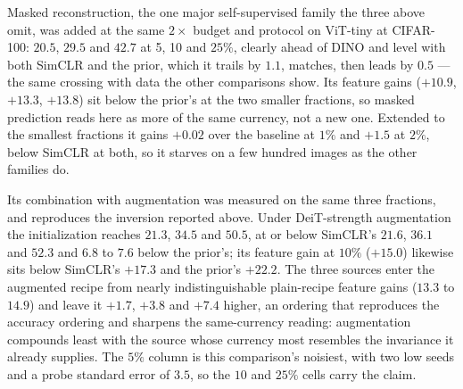  Masked reconstruction, the one major self-supervised family the
three above omit, was added at the same $2\times$ budget and protocol on
ViT-tiny at CIFAR-100: $20.5$, $29.5$ and $42.7$ at 5, 10 and $25\%$, clearly
ahead of DINO and level with both SimCLR and the prior, which it trails by
$1.1$, matches, then leads by $0.5$ --- the same crossing with data the other
comparisons show. Its feature gains ($+10.9$, $+13.3$, $+13.8$) sit below the
prior's at the two smaller fractions, so masked prediction reads here as more
of the same currency, not a new one. Extended to the smallest fractions it
gains $+0.02$ over the baseline at $1\%$ and $+1.5$ at $2\%$, below SimCLR at
both, so it starves on a few hundred images as the other families do.

 Its combination with augmentation was measured on the same three
fractions, and reproduces the inversion reported above. Under DeiT-strength
augmentation the initialization reaches $21.3$, $34.5$ and $50.5$, at or below
SimCLR's $21.6$, $36.1$ and $52.3$ and $6.8$ to $7.6$ below the prior's; its
feature gain at $10\%$ ($+15.0$) likewise sits below SimCLR's $+17.3$ and the
prior's $+22.2$. The three sources enter the augmented recipe from nearly
indistinguishable plain-recipe feature gains ($13.3$ to $14.9$) and leave it
$+1.7$, $+3.8$ and $+7.4$ higher, an ordering that reproduces the accuracy
ordering and sharpens the same-currency reading: augmentation compounds least
with the source whose currency most resembles the invariance it already
supplies. The $5\%$ column is this comparison's noisiest, with two low seeds
and a probe standard error of $3.5$, so the $10$ and $25\%$ cells carry the
claim.

